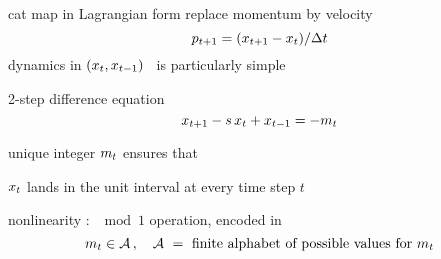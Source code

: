 \begin{frame}{cat map in Lagrangian form}
replace momentum by velocity
\[
p_{t+1}=(x_{t+1}  - x_{t})/\Delta t
\]
dynamics in $(x_{t},x_{t-1})$  \statesp\
is particularly simple
\begin{block}{2-step difference equation}
\[
x_{t+1}  -  s \, x_{t} + x_{t-1}
    =
-{m_{t}}
\] %
\end{block}
unique integer ${m_{t}}$
ensures that

\hfill $x_{t}$ lands in the unit interval at every time step $t$

\bigskip
nonlinearity : $ \mod 1$ operation, encoded in
\[
{m_{t}}\in  \mathcal{A}
\,,\quad \mathcal{A}\ = \mbox{ finite alphabet of possible values for } {\ensuremath{m_{t}}}
\]
\end{frame}

